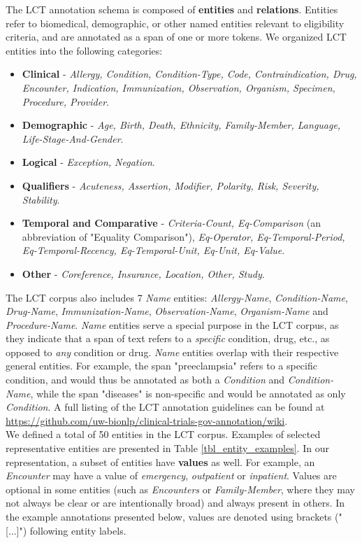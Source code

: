 \documentclass[../main.tex]{subfiles}
\begin{document}
\noindent The LCT annotation schema is composed of \textbf{entities} and 
\textbf{relations}. Entities refer to biomedical, demographic, or other named entities relevant to eligibility criteria, and are annotated as a span of one or more tokens. We organized LCT entities into the following categories:
\begin{itemize}
    \item \textbf{Clinical} - \textit{Allergy, Condition, Condition-Type, Code, Contraindication, Drug, Encounter, Indication, Immunization, Observation, Organism, Specimen, Procedure, Provider}. %
    \item \textbf{Demographic} - \textit{Age, Birth, Death, Ethnicity, Family-Member, Language, Life-Stage-And-Gender}. %
    \item \textbf{Logical} - \textit{Exception, Negation}. %
    \item \textbf{Qualifiers} - \textit{Acuteness, Assertion, Modifier, Polarity, Risk, Severity, Stability}. %
    \item \textbf{Temporal and Comparative} - \textit{Criteria-Count, Eq-Comparison} (an abbreviation of "Equality Comparison"), \textit{Eq-Operator, Eq-Temporal-Period, Eq-Temporal-Recency, Eq-Temporal-Unit, Eq-Unit, Eq-Value}. %
    \item \textbf{Other} - \textit{Coreference, Insurance, Location, Other, Study}. %
\end{itemize}

\noindent The LCT corpus also includes 7 \textit{Name} entities: \textit{Allergy-Name}, \textit{Condition-Name}, \textit{Drug-Name}, \textit{Immunization-Name}, \textit{Observation-Name}, \textit{Organism-Name} and \textit{Procedure-Name}. \textit{Name} entities serve a special purpose in the LCT corpus, as they indicate that a span of text refers to a \textit{specific} condition, drug, etc., as opposed to \textit{any} condition or drug. \textit{Name} entities overlap with their respective general entities. For example, the span "preeclampsia" refers to a specific condition, and would thus be annotated as both a \textit{Condition} and \textit{Condition-Name}, while the span "diseases" is non-specific and would be annotated as only \textit{Condition}. A full listing of the LCT annotation guidelines can be found at \url{https://github.com/uw-bionlp/clinical-trials-gov-annotation/wiki}. \\

\noindent We defined a total of 50 entities in the LCT corpus. Examples of selected representative entities are presented in Table \ref{tbl_entity_examples}. In our representation, a subset of entities have \textbf{values} as well. For example, an \textit{Encounter} may have a value of \textit{emergency}, \textit{outpatient} or \textit{inpatient}. Values are optional in some entities (such as \textit{Encounters} or \textit{Family-Member}, where they may not always be clear or are intentionally broad) and always present in others. In the example annotations presented below, values are denoted using brackets ("[...]") following entity labels. \\
\end{document}
